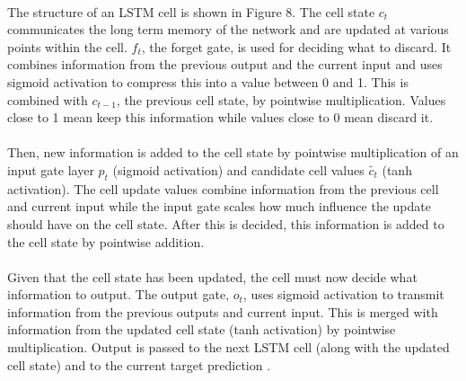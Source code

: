 \documentclass[11pt]{article}
\begin{document}
                    \begin{multicols*}{2}

                    \paragraph{}
                        The structure of an LSTM cell is shown in Figure 8.
                        The cell state $c_t$ communicates the long term memory of the network and are updated at various points within the cell.  
                        $f_t$, the forget gate, is used for deciding what to discard.
                        It combines information from the previous output and the current input and uses sigmoid activation to compress this into a value between 0 and 1.
                        This is combined with $c_{t-1}$, the previous cell state, by pointwise multiplication.
                        Values close to 1 mean keep this information while values close to 0 mean discard it. 
                        
                    \vspace{-10pt}

                    \paragraph{}
                        Then, new information is added to the cell state by pointwise multiplication of an input gate layer $p_t$ (sigmoid activation) and candidate cell values $\tilde{c_t}$ (tanh activation).
                        The cell update values combine information from the previous cell and current input while the input gate scales how much influence the update should have on the cell state.
                        After this is decided, this information is added to the cell state by pointwise addition.

                    \vspace{-10pt}

                    \paragraph{}
                        Given that the cell state has been updated, the cell must now decide what information to output.
                        The output gate, $o_t$, uses sigmoid activation to transmit information from the previous outputs and current input.
                        This is merged with information from the updated cell state (tanh activation) by pointwise multiplication.
                        Output is passed to the next LSTM cell (along with the updated cell state) and to the current target prediction \cite{Olah15}.
                        

\end{multicols*}
\end{document}
